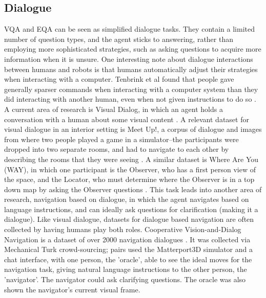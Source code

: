 \subsection{Dialogue}
VQA and EQA can be seen as simplified dialogue tasks. They contain a limited number of question types, and the agent sticks to answering, rather than employing more sophisticated strategies, such as asking questions to acquire more information when it is unsure. One interesting note about dialogue interactions between humans and robots is that humans automatically adjust their strategies when interacting with a computer. %
Tenbrink et al found that people gave generally sparser commands when interacting with a computer system than they did interacting with another human, even when not given instructions to do so \cite{Tenbrink:2010qf}. \newline
A current area of research is Visual Dialog, in which an agent holds a conversation with a human about some visual content \cite{das2017}. A relevant dataset for visual dialogue in an interior setting is Meet Up!, a corpus of dialogue and images from where two people played a game in a simulator--the participants were dropped into two separate rooms, and had to navigate to each other by describing the rooms that they were seeing \cite{meetup}. A similar dataset is Where Are You (WAY), in which one participant is the Observer, who has a first person view of the space, and the Locator, who must determine where the Observer is in a top down map by asking the Observer questions \cite{whereareyou}. This task leads into another area of research, navigation based on dialogue, in which the agent navigates based on language instructions, and can ideally ask questions for clarification (making it a dialogue).  Like visual dialogue, datasets for dialogue based navigation are often collected by having humans play both roles. Cooperative Vision-and-Dialog Navigation is a dataset of over 2000 navigation dialogues \cite{thomason2019visionanddialog}. It was collected via Mechanical Turk crowd-sourcing; pairs used the Matterport3D simulator and a chat interface, with one person, the ’oracle’, able to see the ideal moves for the navigation task, giving natural language instructions to the other person, the ’navigator'. The navigator could ask clarifying questions. The oracle was also shown the navigator's current visual frame. \newline
